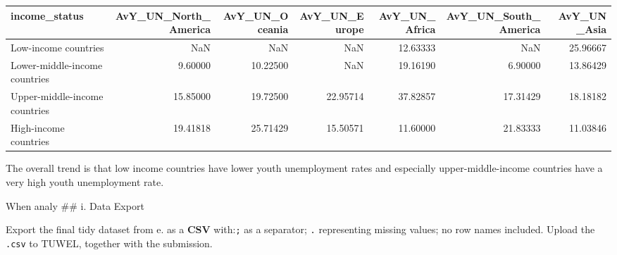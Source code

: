 \documentclass[
]{article}
\begin{document}
\begin{tabular}[t]{l|r|r|r|r|r|r}
\hline
income\_status & AvY\_UN\_North\_America & AvY\_UN\_Oceania & AvY\_UN\_Europe & AvY\_UN\_Africa & AvY\_UN\_South\_America & AvY\_UN\_Asia\\
\hline
Low-income countries & NaN & NaN & NaN & 12.63333 & NaN & 25.96667\\
\hline
Lower-middle-income countries & 9.60000 & 10.22500 & NaN & 19.16190 & 6.90000 & 13.86429\\
\hline
Upper-middle-income countries & 15.85000 & 19.72500 & 22.95714 & 37.82857 & 17.31429 & 18.18182\\
\hline
High-income countries & 19.41818 & 25.71429 & 15.50571 & 11.60000 & 21.83333 & 11.03846\\
\hline
\end{tabular}

The overall trend is that low income countries have lower youth
unemployment rates and especially upper-middle-income countries have a
very high youth unemployment rate.

When analy \#\# i. Data Export

Export the final tidy dataset from e. as a \textbf{CSV} with:\texttt{;}
as a separator; \texttt{.} representing missing values; no row names
included. Upload the \texttt{.csv} to TUWEL, together with the
submission.
\end{document}
